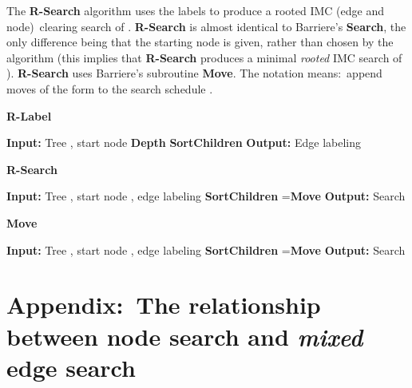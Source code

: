 \documentclass[11pt]{article}\usepackage{amsmath}
\begin{document}
The \textbf{R-Search} algorithm uses the  labels to produce a rooted
IMC (edge and node)\ clearing search of . \textbf{R-Search} is
almost identical to Barriere's \textbf{Search}, the only difference being that
the starting node  is given, rather than chosen by the algorithm (this
implies that \textbf{R-Search} produces a minimal \emph{rooted }IMC search of
). \textbf{R-Search} uses Barriere's subroutine
\textbf{Move}. The notation 
means:\ append  moves of the form  to the search schedule
.

\begin{algorithm}[h]
\label{label}
\caption{\textbf{R-Label}}
\begin{algorithmic}
\STATE \textbf{Input:} Tree , start node 
\STATE  \textbf{Depth}
\FOR{}
\STATE  \textbf{SortChildren}
\STATE 
{}
\STATE 
\ELSE
\STATE 
\ENDIF
\ENDFOR
\ENDFOR
\ENDFOR
\STATE \textbf{Output:} Edge labeling 
\end{algorithmic}
\end{algorithm}


\begin{algorithm}[h]
\caption{\textbf{R-Search}}
\begin{algorithmic}
\STATE \textbf{Input:} Tree , start node , edge labeling 
\STATE 
\STATE  \textbf{SortChildren}
\STATE =\textbf{Move}
\ENDFOR
\STATE \textbf{Output:} Search 
\end{algorithmic}
\label{alg:search}
\end{algorithm}


\begin{algorithm}[h]
\caption{\textbf{Move}}
\begin{algorithmic}
\STATE \textbf{Input:} Tree , start node , edge labeling 
\STATE 
\STATE  \textbf{SortChildren}
\STATE =\textbf{Move}
\ENDFOR
\STATE 
\STATE \textbf{Output:} Search 
\end{algorithmic}
\label{alg:search}
\end{algorithm}


\clearpage


\newpage

\section{Appendix:\ The relationship between node search and \emph{mixed} edge
search}
\end{document}
